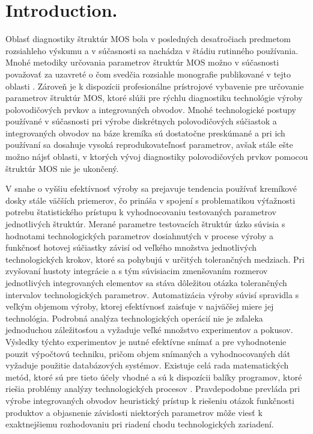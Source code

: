 \chapter{Introduction.} %
\label{Introduction} %

\par Oblasť diagnostiky štruktúr MOS bola v posledných desaťročiach
predmetom rozsiahleho výskumu a v súčasnosti sa nachádza v štádiu
rutinného používania. Mnohé metodiky určovania parametrov štruktúr MOS
možno v súčasnosti považovať za uzavreté o čom svedčia rozsiahle
monografie publikované v tejto oblasti \cite{I.1} \cite{I.2} \cite{I.3}
\cite{I.4}. Zároveň je k dispozícii profesionálne prístrojové vybavenie
pre určovanie parametrov štruktúr MOS, ktoré slúži pre rýchlu
diagnostiku technológie výroby polovodičových prvkov a integrovaných
obvodov. Mnohé technologické postupy používané v súčasnosti pri výrobe
diskrétnych polovodičových súčiastok a integrovaných obvodov na báze
kremíka sú dostatočne preskúmané a pri ich používaní sa dosahuje
vysoká reprodukovateľnosť parametrov, avšak stále ešte možno nájsť
oblasti, v ktorých vývoj diagnostiky polovodičových prvkov pomocou
štruktúr MOS nie je ukončený.

\par V snahe o vyššiu efektívnosť výroby sa prejavuje tendencia
používať kremíkové dosky stále väčších priemerov, čo prináša v spojení
s problematikou výťažnosti potrebu štatistického prístupu k
vyhodnocovaniu testovaných parametrov jednotlivých štruktúr. Merané
parametre testovacích štruktúr úzko súvisia s hodnotami
technologických parametrov dosiahnutých v procese výroby a funkčnosť
hotovej súčiastky závisí od veľkého množstva jednotlivých
technologických krokov, ktoré sa pohybujú v určitých tolerančných
medziach. Pri zvyšovaní hustoty integrácie a s tým súvisiacim
zmenšovaním rozmerov jednotlivých integrovaných elementov sa stáva
dôležitou otázka tolerančných intervalov technologických
parametrov. Automatizácia výroby súvisí spravidla s veľkým objemom
výroby, ktorej efektívnosť zaisťuje v najväčšej miere jej
technológia. Podrobná analýza technologických operácií nie je zďaleka
jednoduchou záležitosťou a vyžaduje veľké množstvo experimentov a
pokusov. Výsledky týchto experimentov je nutné efektívne snímať a pre
vyhodnotenie pouzit výpočtovú techniku, pričom objem snímaných a
vyhodnocovaných dát vyžaduje použitie databázových systémov.  Existuje
celá rada matematických metód, ktoré sú pre tieto účely vhodné a sú k
dispozícii balíky programov, ktoré riešia problémy analýzy
technologických procesov \cite{I.5}. Pravdepodobne prevláda pri výrobe
integrovaných obvodov heuristický prístup k riešeniu otázok funkčnosti
produktov a objasnenie závislosti niektorých parametrov môže viesť k
exaktnejšiemu rozhodovaniu pri riadení chodu technologických
zariadení.

